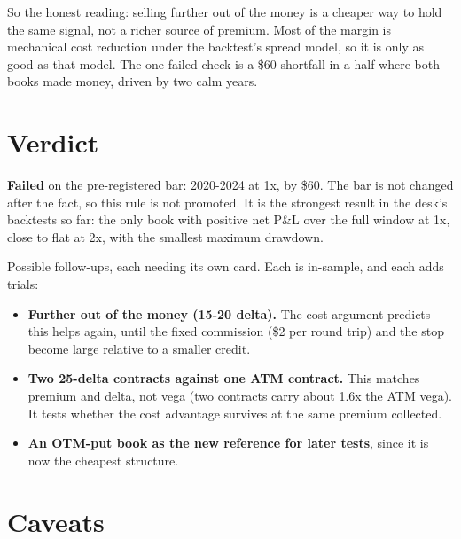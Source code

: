 \documentclass{article}
\begin{document}
So the honest reading: selling further out of the money is a cheaper way to hold the same signal, not a richer source of premium. Most of the margin is mechanical cost reduction under the backtest's spread model, so it is only as good as that model. The one failed check is a \$60 shortfall in a half where both books made money, driven by two calm years.

\section{Verdict}

\textbf{Failed} on the pre-registered bar: 2020-2024 at 1x, by \$60. The bar is not changed after the fact, so this rule is not promoted. It is the strongest result in the desk's backtests so far: the only book with positive net P\&L over the full window at 1x, close to flat at 2x, with the smallest maximum drawdown.

Possible follow-ups, each needing its own card. Each is in-sample, and each adds trials:

\begin{itemize}

\item \textbf{Further out of the money (15-20 delta).} The cost argument predicts this helps again, until the fixed commission (\$2 per round trip) and the stop become large relative to a smaller credit.

\item \textbf{Two 25-delta contracts against one ATM contract.} This matches premium and delta, not vega (two contracts carry about 1.6x the ATM vega). It tests whether the cost advantage survives at the same premium collected.

\item \textbf{An OTM-put book as the new reference for later tests}, since it is now the cheapest structure.

\end{itemize}

\section{Caveats}
\end{document}
